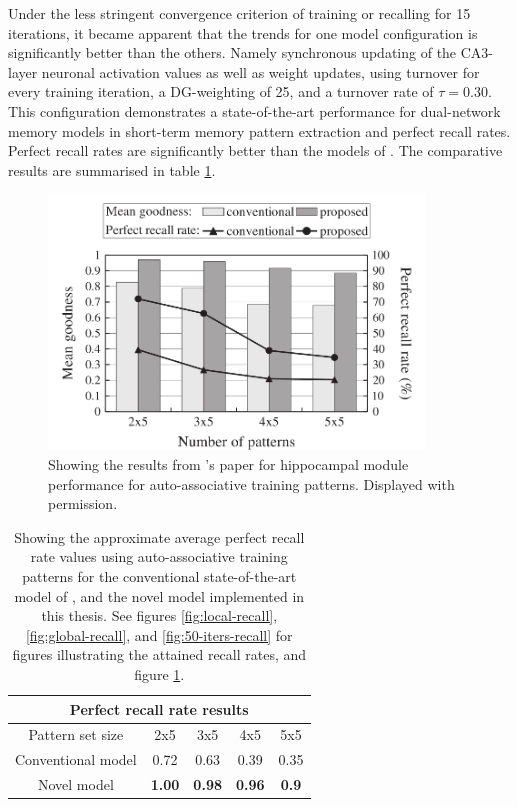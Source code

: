 Under the less stringent convergence criterion of training or recalling for 15 iterations, it became apparent that the trends for one model configuration is significantly better than the others. Namely synchronous updating of the CA3-layer neuronal activation values as well as weight updates, using turnover for every training iteration, a DG-weighting of 25, and a turnover rate of $\tau=0.30$.
This configuration demonstrates a state-of-the-art performance for dual-network memory models in short-term memory pattern extraction and perfect recall rates. Perfect recall rates are significantly better than the models of \citep{Hattori2014, Hattori2010}. The comparative results are summarised in table \ref{table:comparison-perfect-recall-rates}.

\begin{figure}
    \centering
    \includegraphics[width=10cm]{fig/fig6_hattori2014}
    \caption{Showing the results from \citeauthor{Hattori2014}'s \citeyear{Hattori2014} paper for hippocampal module performance for auto-associative training patterns. Displayed with permission.}
    \label{fig:fig6_hattori14}
\end{figure}

\begin{table}[]
\centering
\caption{Showing the approximate average perfect recall rate values using auto-associative training patterns for the conventional state-of-the-art model of \citep{Hattori2014}, and the novel model implemented in this thesis. See figures \ref{fig:local-recall}, \ref{fig:global-recall}, and \ref{fig:50-iters-recall} for figures illustrating the attained recall rates, and figure \ref{fig:fig6_hattori14}.}
\label{table:comparison-perfect-recall-rates}
\begin{tabular}{|c|c|c|c|c|}
\hline
\multicolumn{5}{|c|}{Perfect recall rate results}                                         \\ \hline
Pattern set size   & 2x5           & 3x5           & 4x5           & 5x5           \\ \hline
Conventional model & 0.72 & 0.63 & 0.39 & 0.35 \\ \hline
Novel model        & \textbf{1.00} & \textbf{0.98} & \textbf{0.96} & \textbf{0.9}  \\ \hline
\end{tabular}
\end{table}



